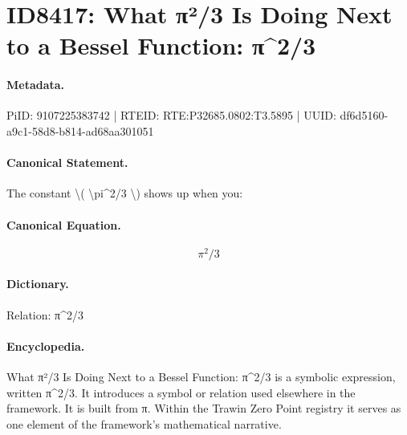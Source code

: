 \section*{ID8417: What π²/3 Is Doing Next to a Bessel Function: π\textasciicircum{}2/3}
\paragraph{Metadata.}
PiID: 9107225383742 | RTEID: RTE:P32685.0802:T3.5895 | UUID: df6d5160-a9c1-58d8-b814-ad68aa301051

\paragraph{Canonical Statement.}
The constant \textbackslash{}( \textbackslash{}pi\textasciicircum{}2/3 \textbackslash{}) shows up when you:

\paragraph{Canonical Equation.}
\[
\pi^2/3
\]

\paragraph{Dictionary.}
Relation: π\textasciicircum{}2/3

\paragraph{Encyclopedia.}
What π²/3 Is Doing Next to a Bessel Function: π\textasciicircum{}2/3 is a symbolic expression, written π\textasciicircum{}2/3. It introduces a symbol or relation used elsewhere in the framework. It is built from π. Within the Trawin Zero Point registry it serves as one element of the framework's mathematical narrative.
